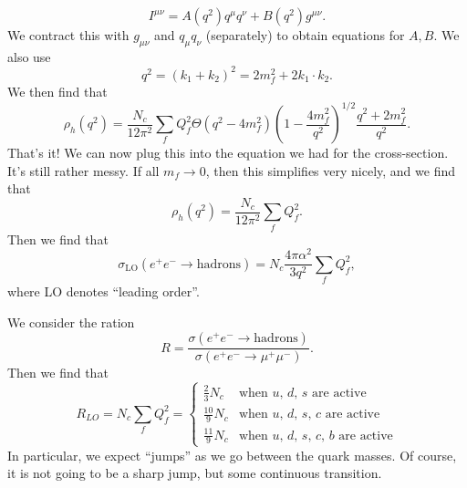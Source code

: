 \documentclass[a4paper]{article}
\begin{document}
\[
  I^{\mu\nu} = A(q^2) q^\mu q^\nu + B(q^2) g^{\mu\nu}.
\]
We contract this with $g_{\mu\nu}$ and $q_\mu q_\nu$ (separately) to obtain equations for $A, B$. We also use
\[
  q^2 = (k_1 + k_2)^2 = 2 m_f^2 + 2 k_1 \cdot k_2.
\]
We then find that
\[
  \rho_h(q^2) = \frac{N_c}{12 \pi^2} \sum_f Q_f^2 \Theta(q^2 - 4 m_f^2)\left(1 - \frac{4 m_f^2}{q^2}\right)^{1/2} \frac{q^2 + 2 m_f^2}{q^2}.
\]
That's it! We can now plug this into the equation we had for the cross-section. It's still rather messy. If all $m_f \to 0$, then this simplifies very nicely, and we find that
\[
  \rho_h(q^2) = \frac{N_c}{12 \pi^2} \sum_f Q_f^2.
\]
Then we find that
\[
  \sigma_{\mathrm{LO}}(e^+ e^- \to \mathrm{hadrons}) = N_c \frac{4\pi \alpha^2}{3q^2} \sum_f Q_f^2,
\]
where LO denotes ``leading order''.

We consider the ration
\[
  R = \frac{\sigma(e^+ e^- \to \mathrm{hadrons})}{\sigma(e^+ e^- \to \mu^+ \mu^-)}.
\]
Then we find that
\[
  R_{LO} = N_c \sum_f Q_f^2 =
  \begin{cases}
    \frac{2}{3} N_c & \text{when $u$, $d$, $s$ are active}\\
    \frac{10}{9} N_c & \text{when $u$, $d$, $s$, $c$ are active}\\
    \frac{11}{9} N_c & \text{when $u$, $d$, $s$, $c$, $b$ are active}
  \end{cases}
\]
In particular, we expect ``jumps'' as we go between the quark masses. Of course, it is not going to be a sharp jump, but some continuous transition.
\end{document}
